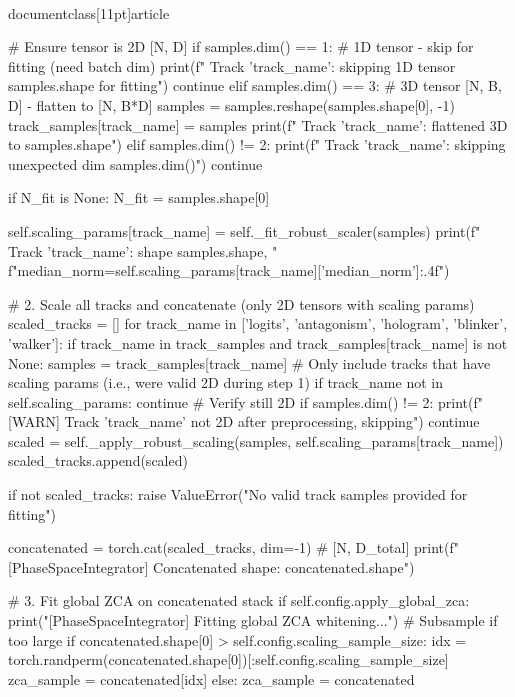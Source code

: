 \\documentclass[11pt]{article}
\begin{document}
\begin{CodeBlock}
            # Ensure tensor is 2D [N, D]
            if samples.dim() == 1:
                # 1D tensor - skip for fitting (need batch dim)
                print(f"  Track '{track_name}': skipping 1D tensor {samples.shape} for fitting")
                continue
            elif samples.dim() == 3:
                # 3D tensor [N, B, D] - flatten to [N, B*D]
                samples = samples.reshape(samples.shape[0], -1)
                track_samples[track_name] = samples
                print(f"  Track '{track_name}': flattened 3D to {samples.shape}")
            elif samples.dim() != 2:
                print(f"  Track '{track_name}': skipping unexpected dim {samples.dim()}")
                continue

            if N_fit is None:
                N_fit = samples.shape[0]

            self.scaling_params[track_name] = self._fit_robust_scaler(samples)
            print(f"  Track '{track_name}': shape {samples.shape}, "
                  f"median_norm={self.scaling_params[track_name]['median_norm']:.4f}")

        # 2. Scale all tracks and concatenate (only 2D tensors with scaling params)
        scaled_tracks = []
        for track_name in ['logits', 'antagonism', 'hologram', 'blinker', 'walker']:
            if track_name in track_samples and track_samples[track_name] is not None:
                samples = track_samples[track_name]
                # Only include tracks that have scaling params (i.e., were valid 2D during step 1)
                if track_name not in self.scaling_params:
                    continue
                # Verify still 2D
                if samples.dim() != 2:
                    print(f"  [WARN] Track '{track_name}' not 2D after preprocessing, skipping")
                    continue
                scaled = self._apply_robust_scaling(samples, self.scaling_params[track_name])
                scaled_tracks.append(scaled)

        if not scaled_tracks:
            raise ValueError("No valid track samples provided for fitting")

        concatenated = torch.cat(scaled_tracks, dim=-1)  # [N, D_total]
        print(f"[PhaseSpaceIntegrator] Concatenated shape: {concatenated.shape}")

        # 3. Fit global ZCA on concatenated stack
        if self.config.apply_global_zca:
            print("[PhaseSpaceIntegrator] Fitting global ZCA whitening...")
            # Subsample if too large
            if concatenated.shape[0] > self.config.scaling_sample_size:
                idx = torch.randperm(concatenated.shape[0])[:self.config.scaling_sample_size]
                zca_sample = concatenated[idx]
            else:
                zca_sample = concatenated


\end{CodeBlock}
\end{document}
